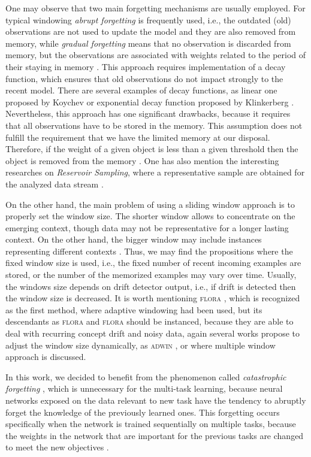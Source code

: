 One may observe that two main forgetting mechanisms are usually employed. For typical windowing \emph{abrupt forgetting} is frequently used, i.e., the outdated (old) observations are not used to update the model and they are also removed from memory, while \emph{gradual forgetting} means that no observation is discarded from memory, but the observations are associated with weights related to the period of their staying in memory \cite{Gama:2014}. This approach requires implementation of a decay function, which ensures that old observations do not impact strongly to the recent model. There are several examples of decay functions, as linear one proposed by Koychev \cite{Koychev:2000} or exponential decay function proposed by Klinkerberg \cite{Klinkenberg:2004}. Nevertheless, this approach has one significant drawbacks, because it requires that all observations have to be stored in the memory. This assumption does not fulfill the requirement that we have the limited memory at our disposal. Therefore, if the weight of a given object is less than a given threshold then the object is removed from the memory \cite{Wozniak:2013}. One has also mention the interesting researches on \emph{Reservoir Sampling}, where a representative sample are obtained for the analyzed data stream \cite{Vitter:1985}.

On the other hand, the main problem of using a sliding window approach is to properly set the window size. The shorter window allows to concentrate on the emerging context, though data may not be representative for a longer lasting context. On the other hand, the bigger window may include  instances representing different contexts \cite{Kurlej:2011}. Thus, we may find the propositions where the fixed window size is used, i.e., the fixed number of recent incoming examples are stored, or the number of the memorized examples may vary over time. Usually, the windows size depends on drift detector output, i.e., if drift is detected then the window size is decreased. It is worth mentioning \textsc{flora} \cite{Widmer:1996}, which is recognized as the first method, where adaptive windowing had been used, but its descendants as \textsc{flora} and \textsc{flora} should be instanced, because they are able to deal with recurring concept drift and noisy data, again several works propose to adjust the window size dynamically, as  \textsc{adwin} \cite{Bifet:2007}, or \cite{Lazarescu:2004} where multiple window approach is discussed. 

In this work, we decided to benefit from the phenomenon called \emph{catastrophic forgetting} \cite{Kirkpatrick:2017}, which is unnecessary for the multi-task learning, because neural networks exposed on the data relevant to new task have the tendency to abruptly forget the knowledge of the previously learned ones. This  forgetting occurs specifically when the network is trained sequentially on multiple tasks, because the weights in the network that are important for the previous tasks are changed to meet the new objectives \cite{Kumaran:2016}.

